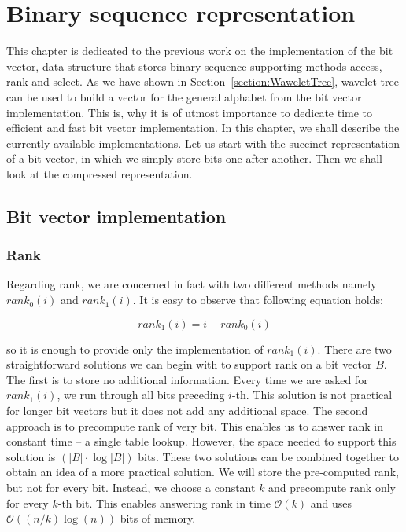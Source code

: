 \chapter{Binary sequence representation}
\label{kap:kap2}

This chapter is dedicated to the previous work on the implementation of the bit vector, data
structure that stores binary sequence supporting methods access, rank and select. As we have
shown in Section~\ref{section:WaweletTree}, wavelet tree can be used to build a vector
for the general alphabet from the bit vector implementation. This is, why it is of utmost
importance to dedicate time to efficient and fast bit vector implementation. In this
chapter, we shall describe the currently available implementations. Let us start with
the succinct representation of a bit vector, in which we simply store bits one after another.
Then we shall look at the compressed representation.

\section{Bit vector implementation}

\subsection{Rank}
\label{section:rank}

Regarding rank, we are concerned in fact with two different methods namely $rank_0(i)$ and
$rank_1(i)$. It is easy to observe that following equation holds:

                    $$rank_1(i) = i - rank_0(i)$$

so it is enough to provide only the implementation of $rank_1(i)$.
There are two straightforward solutions we can begin with to support rank on a bit vector
$B$. The first is to store no additional information. Every time we are asked
for $rank_1(i)$, we run through all bits preceding $i$-th. This solution is not
practical for longer bit vectors but it does not add any additional space. The second
approach is to precompute rank of very bit. This enables us to answer rank in constant
time -- a single table lookup. However, the space needed to support this
solution is $(|B|\cdot\log |B|)$ bits. These two solutions can be combined together to obtain an
idea of a more practical solution. We will store the pre-computed rank, but not for every
bit. Instead, we choose a constant $k$ and precompute rank only for every $k$-th bit. This
enables answering rank in time $\mathcal{O}(k)$ and uses $\mathcal{O}((n/k)\log(n))$ bits of
memory.


